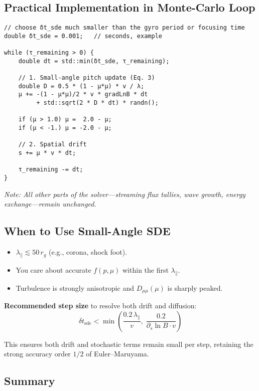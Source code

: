 {\subsection*{Practical Implementation in Monte-Carlo Loop}

\begin{lstlisting}
// choose δt_sde much smaller than the gyro period or focusing time
double δt_sde = 0.001;   // seconds, example

while (τ_remaining > 0) {
    double dt = std::min(δt_sde, τ_remaining);

    // 1. Small-angle pitch update (Eq. 3)
    double D = 0.5 * (1 - μ*μ) * v / λ;
    μ += -(1 - μ*μ)/2 * v * gradLnB * dt
         + std::sqrt(2 * D * dt) * randn();

    if (μ > 1.0) μ =  2.0 - μ;
    if (μ < -1.) μ = -2.0 - μ;

    // 2. Spatial drift
    s += μ * v * dt;

    τ_remaining -= dt;
}
\end{lstlisting}

\noindent
\textit{Note: All other parts of the solver—streaming flux tallies, wave growth, energy exchange—remain unchanged.}

\subsection*{When to Use Small-Angle SDE}

\begin{itemize}
  \item $\lambda_\parallel \lesssim 50\,r_g$ (e.g., corona, shock foot).
  \item You care about accurate $f(p,\mu)$ within the first $\lambda_\parallel$.
  \item Turbulence is strongly anisotropic and $D_{\mu\mu}(\mu)$ is sharply peaked.
\end{itemize}

\noindent
\textbf{Recommended step size} to resolve both drift and diffusion:
\[
\delta t_{\text{sde}} <
\min\left( \frac{0.2\,\lambda_\parallel}{v},\;
           \frac{0.2}{\partial_s\!\ln B \cdot v} \right)
\]

This ensures both drift and stochastic terms remain small per step, retaining the strong accuracy order $1/2$ of Euler–Maruyama.

\subsection*{Summary}

}
